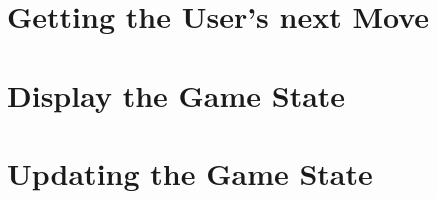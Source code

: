 \documentclass[nobib]{tufte-handout}
\begin{document}
\section{Getting the User's next Move}

\section{Display the Game State}

\section{Updating the Game State}
\end{document}
